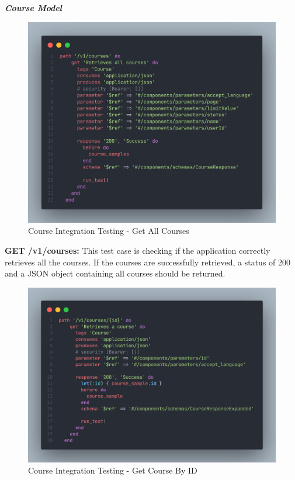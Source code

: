 \begin{justify}
\vspace{0.25cm}
\newendline \textbf{\textit{Course Model}}\newendline

\begin{figure}[H]
    \centerline{\includegraphics[width=150mm,scale=1]{figures/implementation_and_testing/testing/AIT/get_v1_courses.png}}
    \caption{Course Integration Testing - Get All Courses}
    \label{Course Integration Testing - Get All Courses}
\end{figure}

\noindent \textbf{GET /v1/courses:} This test case is checking if the application correctly retrieves all the courses. If the courses are successfully retrieved, a status of 200 and a JSON object containing all courses should be returned.

\begin{figure}[H]
    \centerline{\includegraphics[width=150mm,scale=1]{figures/implementation_and_testing/testing/AIT/get_v1_course.png}}
    \caption{Course Integration Testing - Get Course By ID}
    \label{Course Integration Testing - Get Course By ID}
\end{figure}


\end{justify}
